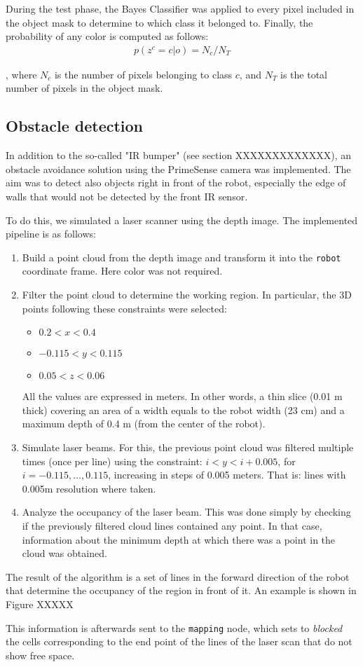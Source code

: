 During the test phase, the Bayes Classifier was applied to every pixel included in the object mask to determine to which class it belonged to. Finally, the probability of any color is computed as follows:
\begin{align}
p(z^c = c | o ) = N_c / N_T
\end{align}

, where $N_c$ is the number of pixels belonging to class $c$, and $N_T$ is the total number of pixels in the object mask. 

\subsection{Obstacle detection}

In addition to the so-called "IR bumper" (see section XXXXXXXXXXXXX), an obstacle avoidance solution using the PrimeSense camera was implemented. The aim was to detect also objects right in front of the robot, especially the edge of walls that would not be detected by the front IR sensor.

To do this, we simulated a laser scanner using the depth image. The implemented pipeline is as follows:

\begin{enumerate}
\item Build a point cloud from the depth image and transform it into the \texttt{robot} coordinate frame. Here color was not required. 
\item Filter the point cloud to determine the working region. In particular, the 3D points following these constraints were selected:
\begin{itemize}
\item $0.2 < x < 0.4$
\item $-0.115 < y < 0.115 $
\item $0.05 < z < 0.06$
\end{itemize}

All the values are expressed in meters. In other words, a thin slice (0.01 m thick) covering an area of a width equals to the robot width (23 cm) and a maximum depth of 0.4 m (from the center of the robot).

\item Simulate laser beams. For this, the previous point cloud was filtered multiple times (once per line) using the constraint: $ i < y < i+0.005$, for $i = -0.115, \dots, 0.115$, increasing in steps of 0.005 meters. That is: lines with 0.005m resolution where taken. 
\item Analyze the occupancy of the laser beam. This was done simply by checking if the previously filtered cloud lines contained any point. In that case, information about the minimum depth at which there was a point in the cloud was obtained.
\end{enumerate}

The result of the algorithm is a set of lines in the forward direction of the robot that determine the occupancy of the region in front of it. An example is shown in Figure XXXXX

This information is afterwards sent to the \texttt{mapping} node, which sets to \emph{blocked} the cells corresponding to the end point of the lines of the laser scan that do not show free space. 
